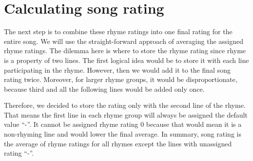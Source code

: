 \section{Calculating song rating}\label{sec:song-rating}
The next step is to combine these rhyme ratings into one final rating for the entire song. We will use the straight-forward approach of averaging the assigned rhyme ratings. The dilemma here is where to store the rhyme rating since rhyme is a property of two lines. The first logical idea would be to store it with each line participating in the rhyme. However, then we would add it to the final song rating twice. Moreover, for larger rhyme groups, it would be disproportionate, because third and all the following lines would be added only once. 

Therefore, we decided to store the rating only with the second line of the rhyme. That means the first line in each rhyme group will always be assigned the default value ``-''. It cannot be assigned rhyme rating 0 because that would mean it is a non-rhyming line and would lower the final average. In summary, song rating is the average of rhyme ratings for all rhymes except the lines with unassigned rating ``-''.
